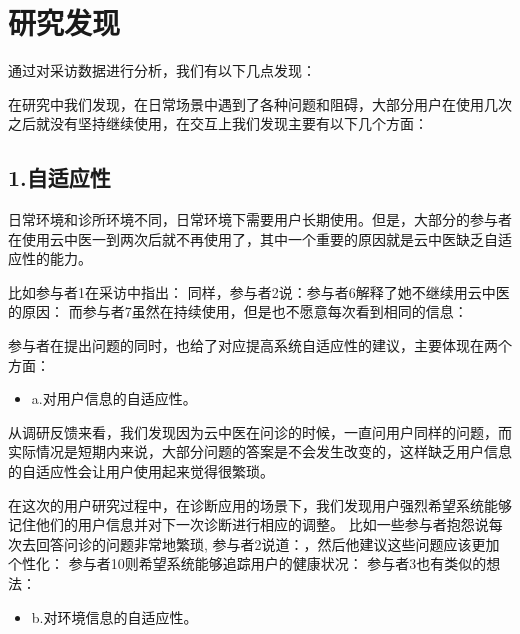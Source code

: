 \section{研究发现}

通过对采访数据进行分析，我们有以下几点发现：


在研究中我们发现，在日常场景中遇到了各种问题和阻碍，大部分用户在使用几次之后就没有坚持继续使用，在交互上我们发现主要有以下几个方面：

\subsection{1.自适应性}

日常环境和诊所环境不同，日常环境下需要用户长期使用。但是，大部分的参与者在使用云中医一到两次后就不再使用了，其中一个重要的原因就是云中医缺乏自适应性的能力。

比如参与者1在采访中指出：
同样，参与者2说：参与者6解释了她不继续用云中医的原因：
而参与者7虽然在持续使用，但是也不愿意每次看到相同的信息：

参与者在提出问题的同时，也给了对应提高系统自适应性的建议，主要体现在两个方面：

\begin{itemize}
\item a.对用户信息的自适应性。
\end{itemize}

从调研反馈来看，我们发现因为云中医在问诊的时候，一直问用户同样的问题，而实际情况是短期内来说，大部分问题的答案是不会发生改变的，这样缺乏用户信息的自适应性会让用户使用起来觉得很繁琐。

在这次的用户研究过程中，在诊断应用的场景下，我们发现用户强烈希望系统能够记住他们的用户信息并对下一次诊断进行相应的调整。
比如一些参与者抱怨说每次去回答问诊的问题非常地繁琐, 参与者2说道：，然后他建议这些问题应该更加个性化：
参与者10则希望系统能够追踪用户的健康状况：
参与者3也有类似的想法：

\begin{itemize}
\item b.对环境信息的自适应性。
\end{itemize}

